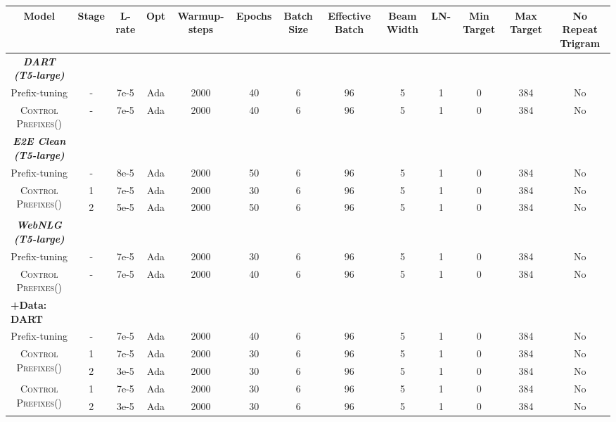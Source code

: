 \documentclass[11pt]{article}
\newcommand{\control}{\textsc{Control Prefixes}\xspace}
\begin{document}
\begin{table*}[htb!]
\scriptsize
\centering
  \begin{adjustbox}{max width=\textwidth}{
  \begin{tabular}{ccccccccccccc}

    Model &  Stage & L-rate & Opt & Warmup-steps & Epochs  & Batch Size & Effective Batch & Beam Width & LN- & Min Target & Max Target & No Repeat Trigram\\\toprule
        \multicolumn{1}{c}{\it \textbf{DART (T5-large)}} \\
        \midrule
        \scriptsize{Prefix-tuning}   & - & 7e-5 & Ada & 2000  & 40 & 6 & 96 & 5 & 1 & 0 & 384 & No\\
    \scriptsize{\control ()}   & - & 7e-5 & Ada & 2000  & 40 & 6 & 96 & 5 & 1 & 0 & 384 & No\\
    \midrule
    \multicolumn{1}{c}{\it \textbf{E2E Clean (T5-large)}}\\

\midrule
    \scriptsize{Prefix-tuning}   &  - & 8e-5 & Ada & 2000  & 50 & 6 & 96 & 5 & 1 & 0 & 384 & No\\
    \multirow{2}{*}{\scriptsize{\control ()}} & 1 & 7e-5 & Ada & 2000  & 30 & 6 & 96 & 5 & 1 & 0 & 384 & No\\ & 2 & 5e-5 & Ada & 2000  & 50 & 6 & 96 & 5 & 1 & 0 & 384 & No\\
    
\midrule
    
    \multicolumn{1}{c}{\it \textbf{WebNLG (T5-large)}} \\
    \midrule

    
  \scriptsize{Prefix-tuning} & - & 7e-5 & Ada & 2000  & 30 & 6 & 96 & 5 & 1 & 0 & 384 & No\\
      \scriptsize{\control ()}   & - & 7e-5 & Ada & 2000  & 40 & 6 & 96 & 5 & 1 & 0 & 384 & No\\
     \midrule
    \multicolumn{1}{l}{\scriptsize{\textbf{+Data: DART}}} \\
 


    \scriptsize{Prefix-tuning}   & - & 7e-5 & Ada & 2000  & 40 & 6 & 96 & 5 & 1 & 0 & 384 & No\\
    \multirow{2}{*}{\scriptsize{\control ()}} & 1 & 7e-5 & Ada & 2000  & 30 & 6 & 96 & 5 & 1 & 0 & 384 & No\\ & 2 & 3e-5 & Ada & 2000  & 30 & 6 & 96 & 5 & 1 & 0 & 384 & No\\
      \multirow{2}{*}{\scriptsize{\control ()}} & 1 & 7e-5 & Ada & 2000  & 30 & 6 & 96 & 5 & 1 & 0 & 384 & No\\ & 2 & 3e-5 & Ada & 2000  & 30 & 6 & 96 & 5 & 1 & 0 & 384 & No\\
 




\end{tabular}}
\end{adjustbox}
\end{table*}
\end{document}
